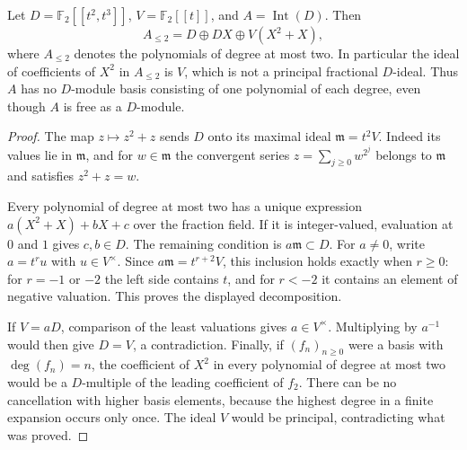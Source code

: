 \begin{lemma}
\label{lem:cusp-no-regular-basis}
Let $D=\mathbb F_2[[t^2,t^3]]$, $V=\mathbb F_2[[t]]$, and
$A=\operatorname{Int}(D)$. Then
\[
 A_{\le2}=D\oplus DX\oplus V(X^2+X),
\]
where $A_{\le2}$ denotes the polynomials of degree at most two.
In particular the ideal of coefficients of $X^2$ in $A_{\le2}$
is $V$, which is not a principal fractional $D$-ideal. Thus $A$
has no $D$-module basis consisting of one polynomial of each
degree, even though $A$ is free as a $D$-module.
\end{lemma}
\begin{proof}
The map $z\mapsto z^2+z$ sends $D$ onto its maximal ideal
$\mathfrak m=t^2V$. Indeed its values lie in $\mathfrak m$, and
for $w\in\mathfrak m$ the convergent series
$z=\sum_{j\ge0}w^{2^j}$ belongs to $\mathfrak m$ and satisfies
$z^2+z=w$.

Every polynomial of degree at most two has a unique expression
$a(X^2+X)+bX+c$ over the fraction field. If it is integer-valued,
evaluation at $0$ and $1$ gives $c,b\in D$. The remaining
condition is $a\mathfrak m\subset D$. For $a\ne0$, write
$a=t^r u$ with $u\in V^\times$. Since $a\mathfrak m=t^{r+2}V$,
this inclusion holds exactly when $r\ge0$: for $r=-1$ or $-2$
the left side contains $t$, and for $r<-2$ it contains an element
of negative valuation. This proves the displayed decomposition.

If $V=aD$, comparison of the least valuations gives $a\in V^\times$.
Multiplying by $a^{-1}$ would then give $D=V$, a contradiction.
Finally, if $(f_n)_{n\ge0}$ were a basis with $\deg(f_n)=n$, the
coefficient of $X^2$ in every polynomial of degree at most two
would be a $D$-multiple of the leading coefficient of $f_2$.
There can be no cancellation with higher basis elements, because
the highest degree in a finite expansion occurs only once.
The ideal $V$ would be principal, contradicting what was proved.
\end{proof}
